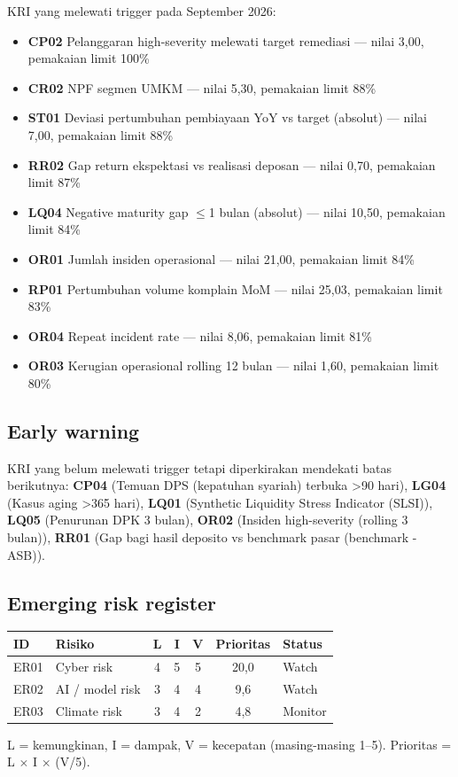 \documentclass[11pt,a4paper]{article}
\begin{document}
KRI yang melewati trigger pada September 2026:
\begin{itemize}
\item \textbf{CP02} Pelanggaran high-severity melewati target remediasi --- nilai 3{,}00, pemakaian limit 100\%
\item \textbf{CR02} NPF segmen UMKM --- nilai 5{,}30, pemakaian limit 88\%
\item \textbf{ST01} Deviasi pertumbuhan pembiayaan YoY vs target (absolut) --- nilai 7{,}00, pemakaian limit 88\%
\item \textbf{RR02} Gap return ekspektasi vs realisasi deposan --- nilai 0{,}70, pemakaian limit 87\%
\item \textbf{LQ04} Negative maturity gap $\leq$1 bulan (absolut) --- nilai 10{,}50, pemakaian limit 84\%
\item \textbf{OR01} Jumlah insiden operasional --- nilai 21{,}00, pemakaian limit 84\%
\item \textbf{RP01} Pertumbuhan volume komplain MoM --- nilai 25{,}03, pemakaian limit 83\%
\item \textbf{OR04} Repeat incident rate --- nilai 8{,}06, pemakaian limit 81\%
\item \textbf{OR03} Kerugian operasional rolling 12 bulan --- nilai 1{,}60, pemakaian limit 80\%
\end{itemize}

\subsection{Early warning}

KRI yang belum melewati trigger tetapi diperkirakan mendekati batas berikutnya: \textbf{CP04} (Temuan DPS (kepatuhan syariah) terbuka >90 hari), \textbf{LG04} (Kasus aging >365 hari), \textbf{LQ01} (Synthetic Liquidity Stress Indicator (SLSI)), \textbf{LQ05} (Penurunan DPK 3 bulan), \textbf{OR02} (Insiden high-severity (rolling 3 bulan)), \textbf{RR01} (Gap bagi hasil deposito vs benchmark pasar (benchmark - ASB)).

\subsection{Emerging risk register}

\begin{center}
\begin{tabularx}{\linewidth}{l>{\raggedright\arraybackslash}p{2.6cm}ccccX}
\toprule
\textbf{ID} & \textbf{Risiko} & \textbf{L} & \textbf{I} & \textbf{V} & \textbf{Prioritas} & \textbf{Status} \\
\midrule
ER01 & Cyber risk & 4 & 5 & 5 & 20{,}0 & Watch\\
ER02 & AI / model risk & 3 & 4 & 4 & 9{,}6 & Watch\\
ER03 & Climate risk & 3 & 4 & 2 & 4{,}8 & Monitor\\
\bottomrule
\end{tabularx}
\end{center}
L = kemungkinan, I = dampak, V = kecepatan (masing-masing 1--5). Prioritas = L $\times$ I $\times$ (V/5).
\end{document}
